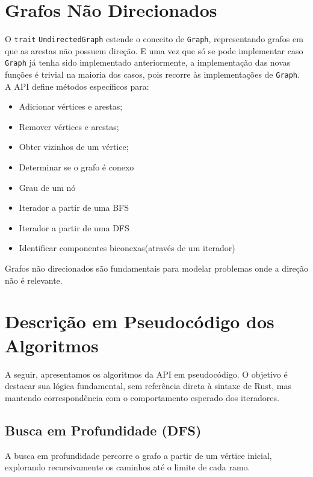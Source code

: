 \section{Grafos Não Direcionados}

O \texttt{trait} \texttt{UndirectedGraph} estende o conceito de \texttt{Graph}, representando grafos em que as arestas não possuem direção. E uma vez que só se pode implementar caso \texttt{Graph} já tenha sido implementado anteriormente, a implementação das novas funções é trivial na maioria dos casos, pois recorre às implementações de \texttt{Graph}. A API define métodos específicos para:

\begin{itemize}
    \item Adicionar vértices e arestas;
    \item Remover vértices e arestas;
    \item Obter vizinhos de um vértice;
    \item Determinar se o grafo é conexo
    \item Grau de um nó
    \item Iterador a partir de uma BFS
    \item Iterador a partir de uma DFS
    \item Identificar componentes biconexas(através de um iterador)
\end{itemize}

Grafos não direcionados são fundamentais para modelar problemas onde a direção não é relevante.

\section{Descrição em Pseudocódigo dos Algoritmos}

A seguir, apresentamos os algoritmos da API em pseudocódigo. O objetivo é destacar sua lógica fundamental, sem referência direta à sintaxe de Rust, mas mantendo correspondência com o comportamento esperado dos iteradores.

\subsection{Busca em Profundidade (DFS)}

A busca em profundidade percorre o grafo a partir de um vértice inicial, explorando recursivamente os caminhos até o limite de cada ramo. 

